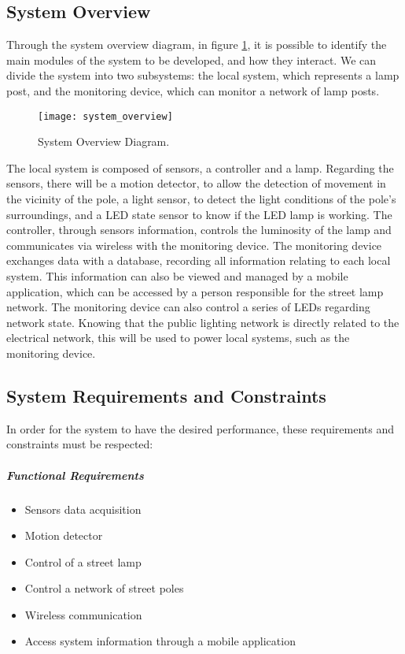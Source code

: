 \subsection{System Overview}
Through the system overview diagram, in figure \ref{fig:system_overview}, it is possible to identify the main modules of the system to be developed, and how they interact. We can divide the system into two subsystems: the local system, which represents a lamp post, and the monitoring device, which can monitor a network of lamp posts.

\begin{figure}[ht]
	\centering
	\texttt{[image: system\_overview]}
	\caption{System Overview Diagram.}
	\label{fig:system_overview}
\end{figure}

The local system is composed of sensors, a controller and a lamp. Regarding the sensors, there will be a motion detector, to allow the detection of movement in the vicinity of the pole, a light sensor, to detect the light conditions of the pole’s surroundings, and a LED state sensor to know if the LED lamp is working. The controller, through sensors information, controls the luminosity of the lamp and communicates via wireless with the monitoring device. The monitoring device exchanges data with a database, recording all information relating to each local system. This information can also be viewed and managed by a mobile application, which can be accessed by a person responsible for the street lamp network. The monitoring device can also control a series of LEDs regarding network state. Knowing that the public lighting network is directly related to the electrical network, this will be used to power local systems, such as the monitoring device.

\subsection{System Requirements and Constraints}
In order for the system to have the desired performance, these requirements and constraints must be respected:

\subparagraph{Functional Requirements}
\begin{itemize}
	\item Sensors data acquisition				\item Motion detector
	\item Control of a street lamp
	\item Control a network of street poles		\item Wireless communication
	\item Access system information through a mobile application
\end{itemize}

